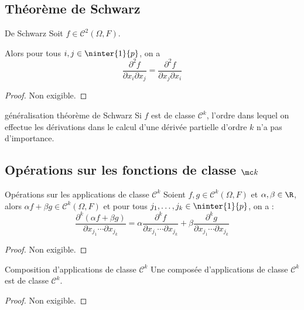 \subsection{Théorème de Schwarz}

\begin{theoreme}{De Schwarz}{}
    Soit $f \in \mathscr C^2(\Omega, F)$.

    Alors pour tous $i, j \in \ninter{1}{p}$, on a 
    $$\frac{\partial^2 f}{\partial x_i \partial x_j} = \frac{\partial^2 f}{\partial x_j \partial x_i}$$
\end{theoreme}

\begin{proof}
    Non exigible.
\end{proof}

\begin{corollaire}{généralisation théorème de Schwarz}{}
    Si $f$ est de classe $\mathscr C^k$, l'ordre dans lequel on effectue les dérivations 
    dans le calcul d'une dérivée partielle d'ordre $k$ n'a pas d'importance.
\end{corollaire}

\subsection{Opérations sur les fonctions de classe \texorpdfstring{$\mc k$}{Ck}}

\begin{proposition}{Opérations sur les applications de classe $\mathscr C^k$}{}
    Soient $f, g \in \mathscr C^k(\Omega, F)$ et $\alpha, \beta \in \R$, alors 
    $\alpha f + \beta g \in \mathscr C^k(\Omega, F)$ et pour tous 
    $j_1, \ldots, j_k \in \ninter{1}{p}$, on a :
    $$\frac{\partial^k (\alpha f + \beta g)}{\partial x_{j_1} \cdots \partial x_{j_k}} = \alpha \frac{\partial^k f}{\partial x_{j_1} \cdots \partial x_{j_k}} + \beta \frac{\partial^k g}{\partial x_{j_1} \cdots \partial x_{j_k}}$$
\end{proposition}

\begin{proof}
    Non exigible. 
\end{proof}

\begin{proposition}{Composition d'applications de classe $\mathscr C^k$}{}
    Une composée d'applications de classe $\mathscr C^k$ est de classe $\mathscr C^k$.
\end{proposition}

\begin{proof}
    Non exigible.
\end{proof}

